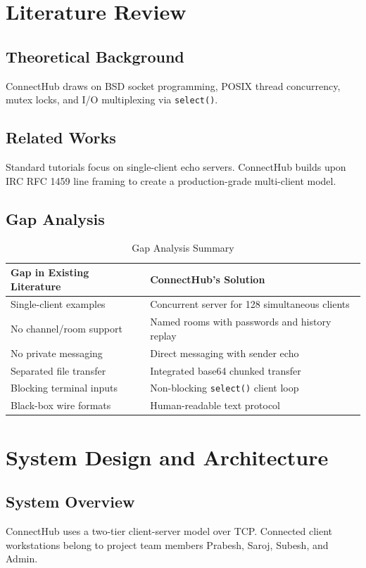 \documentclass[12pt,a4paper]{report}
\begin{document}
\clearpage
\chapter{Literature Review}
\section{Theoretical Background}
ConnectHub draws on BSD socket programming, POSIX thread concurrency, mutex locks, and I/O multiplexing via \texttt{select()}.

\section{Related Works}
Standard tutorials focus on single-client echo servers. ConnectHub builds upon IRC RFC 1459 line framing to create a production-grade multi-client model.

\section{Gap Analysis}
\begin{table}[h!]
\centering
\begin{tabular}{ll}
\toprule
\textbf{Gap in Existing Literature} & \textbf{ConnectHub's Solution} \\
\midrule
Single-client examples & Concurrent server for 128 simultaneous clients \\
No channel/room support & Named rooms with passwords and history replay \\
No private messaging & Direct messaging with sender echo \\
Separated file transfer & Integrated base64 chunked transfer \\
Blocking terminal inputs & Non-blocking \texttt{select()} client loop \\
Black-box wire formats & Human-readable text protocol \\
\bottomrule
\end{tabular}
\caption{Gap Analysis Summary}
\end{table}

\clearpage
\chapter{System Design and Architecture}
\section{System Overview}
ConnectHub uses a two-tier client-server model over TCP. Connected client workstations belong to project team members Prabesh, Saroj, Subesh, and Admin.
\end{document}
